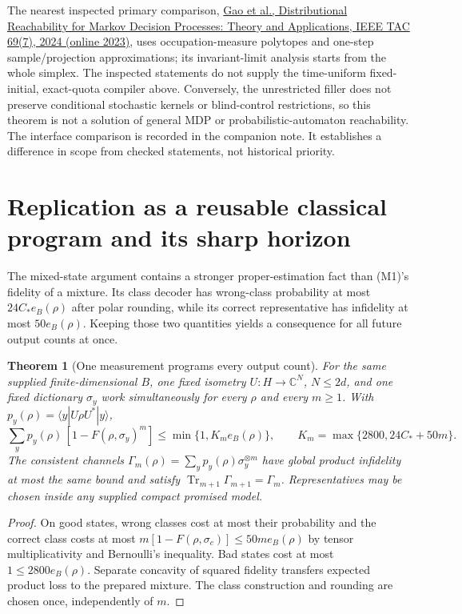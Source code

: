 \documentclass[11pt]{article}
\newtheorem{theorem}{Theorem}
\newcommand{\Tr}{\operatorname{Tr}}
\begin{document}
The nearest inspected primary comparison, \href{https://people.kth.se/~kallej/papers/DistributionaL_TAC023_Gao.pdf}{Gao et al., Distributional Reachability for Markov Decision Processes: Theory and Applications, IEEE TAC 69(7), 2024 (online 2023)}, uses occupation-measure polytopes and one-step sample/projection approximations; its invariant-limit analysis starts from the whole simplex. The inspected statements do not supply the time-uniform fixed-initial, exact-quota compiler above. Conversely, the unrestricted filler does not preserve conditional stochastic kernels or blind-control restrictions, so this theorem is not a solution of general MDP or probabilistic-automaton reachability. The interface comparison is recorded in the companion note. It establishes a difference in scope from checked statements, not historical priority.

\section{Replication as a reusable classical program and its sharp horizon}\label{sec:replication}

The mixed-state argument contains a stronger proper-estimation fact than (M1)'s fidelity of a mixture. Its class decoder has wrong-class probability at most $24C_*e_B(\rho)$ after polar rounding, while its correct representative has infidelity at most $50e_B(\rho)$. Keeping those two quantities yields a consequence for all future output counts at once.

\begin{theorem}[One measurement programs every output count]
For the same supplied finite-dimensional $B$, one fixed isometry $U:H\to\mathbb C^N$, $N\le2d$, and one fixed dictionary $\sigma_y$ work simultaneously for every $\rho$ and every $m\ge1$. With $p_y(\rho)=\langle y|U\rho U^*|y\rangle$,
\[
\sum_y p_y(\rho)\,[1-F(\rho,\sigma_y)^m]
\le\min\{1,K_m e_B(\rho)\},\qquad
K_m=\max\{2800,24C_*+50m\}.
\tag{R1}
\]
The consistent channels $\Gamma_m(\rho)=\sum_y p_y(\rho)\sigma_y^{\otimes m}$ have global product infidelity at most the same bound and satisfy $\Tr_{m+1}\Gamma_{m+1}=\Gamma_m$. Representatives may be chosen inside any supplied compact promised model.
\end{theorem}

\begin{proof}
On good states, wrong classes cost at most their probability and the correct class costs at most $m[1-F(\rho,\sigma_c)]\le50me_B(\rho)$ by tensor multiplicativity and Bernoulli's inequality. Bad states cost at most $1\le2800e_B(\rho)$. Separate concavity of squared fidelity transfers expected product loss to the prepared mixture. The class construction and rounding are chosen once, independently of $m$.
\end{proof}
\end{document}
